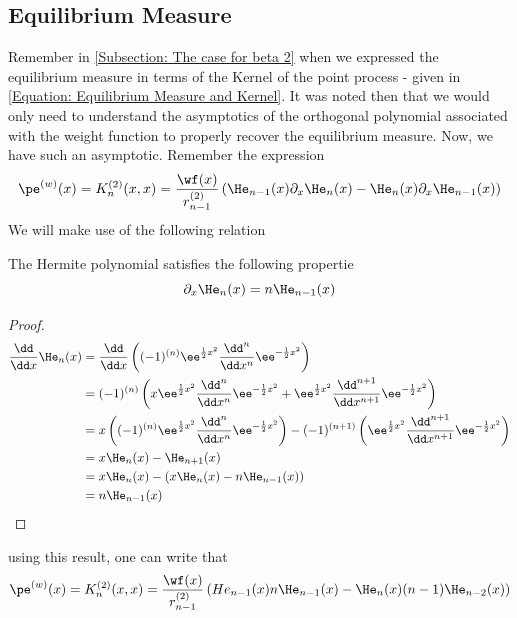 {\subsection{Equilibrium Measure}

Remember in \ref{Subsection: The case for beta 2} when we expressed the equilibrium measure in terms of the Kernel of the point process - given in \ref{Equation: Equilibrium Measure and Kernel}. It was noted then that we would only need to understand the asymptotics of the orthogonal polynomial associated with the weight function to properly recover the equilibrium measure. Now, we have such an asymptotic. Remember the expression
\begin{equation}
	\pe^{(w)}(x) = K_n^{(2)}(x, x) = \frac{\wf(x)}{r_{n-1}^{(2)}} \left( \He_{n-1}(x)\partial_x \He_n(x) - \He_{n}(x)\partial_x \He_{n-1}(x)  \right)
\end{equation}
We will make use of the following relation
\begin{definicao}
	The Hermite polynomial satisfies the following propertie
	\begin{equation}
		\partial_x \He_{n}(x) = n \He_{n-1}(x)
	\end{equation}
\end{definicao}
\begin{proof}
	\begin{align}
		\frac{\dd}{\dd x} \He_n(x) & = \frac{\dd}{\dd x} \left( (-1)^{(n)}\ee^{\frac{1}{2} x^2} \frac{\dd^n}{\dd x^n} \ee^{-\frac{1}{2} x^2} \right) \\
		& = (-1)^{(n)}  \left( x \ee^{\frac{1}{2} x^2} \frac{\dd^n}{\dd x^n} \ee^{-\frac{1}{2} x^2} +  \ee^{\frac{1}{2} x^2} \frac{\dd^{n+1}}{\dd x^{n+1}} \ee^{-\frac{1}{2} x^2}  \right) \\
		& =  x \left( (-1)^{(n)}  \ee^{\frac{1}{2} x^2} \frac{\dd^n}{\dd x^n} \ee^{-\frac{1}{2} x^2} \right) -   (-1)^{(n+1)} \left(  \ee^{\frac{1}{2} x^2} \frac{\dd^{n+1}}{\dd x^{n+1}} \ee^{-\frac{1}{2} x^2} \right)  \\
		& = x \He_n(x) - \He_{n+1}(x) \\
		& = x \He_n(x) - \left(  x\He_n(x) - n \He_{n-1}(x) \right) \\
		& =  n \He_{n-1}(x) 
	\end{align}
\end{proof}
using this result, one can write that
\begin{align}
	\pe^{(w)}(x) = K_n^{(2)}(x, x) & = \frac{\wf(x)}{r_{n-1}^{(2)}} \left( He_{n-1}(x)  n \He_{n-1}(x) - \He_{n}(x)(n-1) \He_{n-2}(x)   \right) \\

\end{align}}
